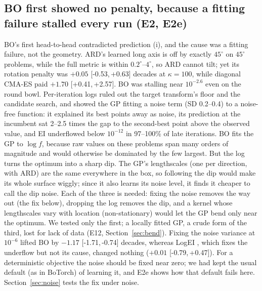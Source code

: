 \documentclass[10pt,a4paper]{article}
\newcommand{\ci}[2]{[#1,\,#2]}
\begin{document}
\subsection{BO first showed no penalty, because a fitting failure stalled every run (E2, E2e)}\label{sec:stall}
BO's first head-to-head contradicted prediction (i), and the cause was a fitting failure, not the geometry. ARD's learned long
axis is off by exactly $45^\circ$ on $45^\circ$ problems, while the full metric is within $0.2^\circ$--$4^\circ$, so ARD cannot tilt;
yet its rotation penalty was $+0.05$ \ci{-0.53}{+0.63} decades at $\kappa=100$, while diagonal CMA-ES paid $+1.70$ \ci{+0.41}{+2.57}.
BO was stalling near $10^{-2.6}$ even on the round bowl. Per-iteration logs ruled out the target transform's floor and the candidate
search, and showed the GP fitting a noise term (SD 0.2--0.4) to a noise-free function: it explained its best points away as noise, its
prediction at the incumbent sat 2--2.5 times the gap to the second-best point above the observed value, and EI underflowed below
$10^{-12}$ in 97--100\% of late iterations. BO fits the GP to $\log f$, because raw values on these problems span many orders of magnitude and would
otherwise be dominated by the few largest. But the log turns the optimum into a sharp dip. The GP's
lengthscales (one per direction, with ARD) are the same everywhere in the box, so following the dip would make
its whole surface wiggly; since it also learns its noise level, it finds it cheaper to call the dip noise.
Each of the three is needed: fixing the noise removes the way out (the fix below), dropping the log removes the
dip, and a kernel whose lengthscales vary with location (non-stationary) would let the GP bend only near the
optimum. We tested only the first; a locally fitted GP, a crude form of the third, lost for lack of data (E12, Section~\ref{sec:bend}). Fixing the noise variance at $10^{-6}$ lifted BO by $-1.17$ \ci{-1.71}{-0.74} decades,
whereas LogEI \citep{ament2023logei}, which fixes the underflow but not its cause, changed nothing ($+0.01$ \ci{-0.79}{+0.47}). For a deterministic objective the noise should be fixed near zero; we had kept the usual default (as in
BoTorch) of learning it, and E2e shows how that default fails here. Section~\ref{sec:noise} tests the fix under noise.
\end{document}
